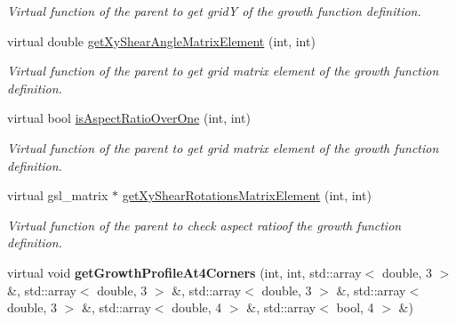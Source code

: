\begin{DoxyCompactItemize}
\begin{DoxyCompactList}\small\item\em Virtual function of the parent to get grid\+Y of the growth function definition. \end{DoxyCompactList}\item 
\hypertarget{classGrowthFunctionBase_a2dbab9e82dc1b1511df64c9a7cdd2dac}{}virtual double \hyperlink{classGrowthFunctionBase_a2dbab9e82dc1b1511df64c9a7cdd2dac}{get\+Xy\+Shear\+Angle\+Matrix\+Element} (int, int)\label{classGrowthFunctionBase_a2dbab9e82dc1b1511df64c9a7cdd2dac}

\begin{DoxyCompactList}\small\item\em Virtual function of the parent to get grid matrix element of the growth function definition. \end{DoxyCompactList}\item 
\hypertarget{classGrowthFunctionBase_ad3048194d1054d24d56bd4b3f178e802}{}virtual bool \hyperlink{classGrowthFunctionBase_ad3048194d1054d24d56bd4b3f178e802}{is\+Aspect\+Ratio\+Over\+One} (int, int)\label{classGrowthFunctionBase_ad3048194d1054d24d56bd4b3f178e802}

\begin{DoxyCompactList}\small\item\em Virtual function of the parent to get grid matrix element of the growth function definition. \end{DoxyCompactList}\item 
\hypertarget{classGrowthFunctionBase_a3cab7817a6f6d4f117f0c0c14334b0ab}{}virtual gsl\+\_\+matrix $\ast$ \hyperlink{classGrowthFunctionBase_a3cab7817a6f6d4f117f0c0c14334b0ab}{get\+Xy\+Shear\+Rotations\+Matrix\+Element} (int, int)\label{classGrowthFunctionBase_a3cab7817a6f6d4f117f0c0c14334b0ab}

\begin{DoxyCompactList}\small\item\em Virtual function of the parent to check aspect ratioof the growth function definition. \end{DoxyCompactList}\item 
\hypertarget{classGrowthFunctionBase_ac62f9b7b6f618495209f9034efd72efb}{}virtual void {\bfseries get\+Growth\+Profile\+At4\+Corners} (int, int, std\+::array$<$ double, 3 $>$ \&, std\+::array$<$ double, 3 $>$ \&, std\+::array$<$ double, 3 $>$ \&, std\+::array$<$ double, 3 $>$ \&, std\+::array$<$ double, 4 $>$ \&, std\+::array$<$ bool, 4 $>$ \&)\label{classGrowthFunctionBase_ac62f9b7b6f618495209f9034efd72efb}


\end{DoxyCompactItemize}

